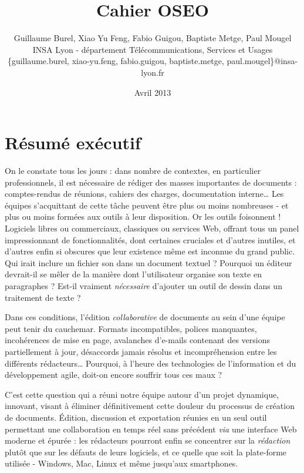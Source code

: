 \documentclass[10pt,twocolumn,a4paper,utf8x]{article}
\title{Cahier OSEO}
\author{Guillaume Burel, Xiao Yu Feng, Fabio Guigou, Baptiste Metge, Paul Mougel\\
INSA Lyon - département Télécommunications, Services et Usages\\
\{guillaume.burel, xiao-yu.feng, fabio.guigou, baptiste.metge, paul.mougel\}@insa-lyon.fr}
\date{Avril 2013}
\begin{document}
\onecolumn
\maketitle

\newpage
\setlength{\columnsep}{1cm}
\twocolumn


\section{Résumé exécutif}

On le constate tous les jours : dans nombre de contextes, en particulier
professionnels, il est nécessaire de rédiger des masses importantes de
documents : comptes-rendus de réunions, cahiers des charges,
documentation interne\ldots{} Les équipes s'acquittant de cette tâche
peuvent être plus ou moins nombreuses - et plus ou moins formées aux
outils à leur disposition. Or les outils foisonnent ! Logiciels libres
ou commerciaux, classiques ou services Web, offrant tous un panel
impressionnant de fonctionnalités, dont certaines cruciales et d'autres
inutiles, et d'autres enfin si obscures que leur existence même est
inconnue du grand public. Qui irait inclure un fichier son dans un
document textuel ? Pourquoi un éditeur devrait-il se mêler de la manière
dont l'utilisateur organise son texte en paragraphes ? Est-il vraiment
\emph{nécessaire} d'ajouter un outil de dessin dans un traitement de
texte ?

Dans ces conditions, l'édition \emph{collaborative} de documents au sein
d'une équipe peut tenir du cauchemar. Formats incompatibles, polices
manquantes, incohérences de mise en page, avalanches d'e-mails contenant
des versions partiellement à jour, désaccords jamais résolus et
incompréhension entre les différents rédacteurs\ldots{} Pourquoi, à
l'heure des technologies de l'information et du développement agile,
doit-on encore souffrir tous ces maux ?

C'est cette question qui a réuni notre équipe autour d'un projet
dynamique, innovant, visant à éliminer définitivement cette douleur du
processus de création de documents. Édition, discussion et exportation
réunies en un seul outil permettant une collaboration en temps réel sans
précédent \emph{via} une interface Web moderne et épurée : les
rédacteurs pourront enfin se concentrer sur la \emph{rédaction} plutôt
que sur les défauts de leurs logiciels, et ce quelle que soit la
plate-forme utilisée - Windows, Mac, Linux et même jusqu'aux
smartphones.
\end{document}
